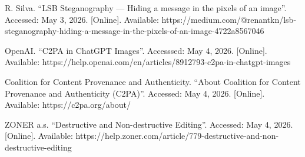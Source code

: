 R. Silva. ``LSB Steganography --- Hiding a message in the pixels of an
image''. Accessed: May 3, 2026. {[}Online{]}. Available:
https://medium.com/@renantkn/lsb-steganography-hiding-a-message-in-the-pixels-of-an-image-4722a8567046

OpenAI. ``C2PA in ChatGPT Images''. Accesssed: May 4, 2026.
{[}Online{]}. Available:
https://help.openai.com/en/articles/8912793-c2pa-in-chatgpt-images

Coalition for Content Provenance and Authenticity. ``About Coalition for
Content Provenance and Authenticity (C2PA)''. Accessed: May 4, 2026.
{[}Online{]}. Available: https://c2pa.org/about/

ZONER a.s. ``Destructive and Non-destructive Editing''. Accessed: May 4,
2026. {[}Online{]}. Available:
https://help.zoner.com/article/779-destructive-and-non-destructive-editing
